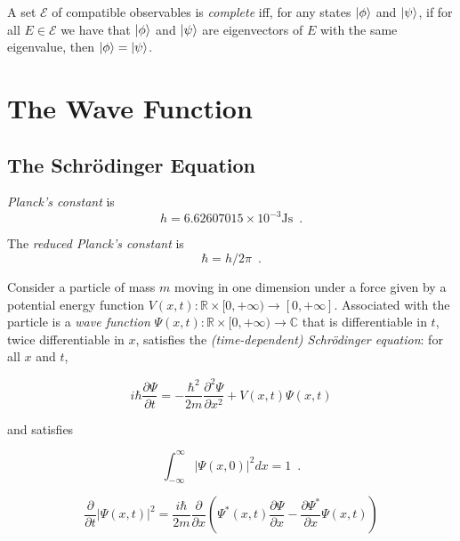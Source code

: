 \begin{df}[Complete]
A set $\mathcal{E}$ of compatible observables is \emph{complete} iff, for any states $\left| {\phi} \right\rangle$ and $\left| {\psi} \right\rangle$, if for all $E \in \mathcal{E}$ we have that $\left| {\phi} \right\rangle$ and $\left| {\psi} \right\rangle$ are eigenvectors of $E$ with the same eigenvalue, then $\left| {\phi} \right\rangle = \left| {\psi} \right\rangle$.
\end{df}

\chapter{The Wave Function}

\section{The Schr\"{o}dinger Equation}

\begin{df}
\emph{Planck's constant} is
\[ h = 6.62607015 \times 10^{-3} \mathrm{Js} \enspace . \]
\end{df}

\begin{df}
The \emph{reduced Planck's constant} is
\[ \hbar = h / 2 \pi \enspace . \]
\end{df}

Consider a particle of mass $m$ moving in one dimension under a force given by a potential energy function $V(x,t) : \mathbb{R} \times [0,+\infty) \rightarrow [0, + \infty]$. Associated with the particle is a \emph{wave function} $\Psi(x,t) : \mathbb{R} \times [0,+\infty) \rightarrow \mathbb{C}$ that is differentiable in $t$, twice differentiable in $x$, satisfies the \emph{(time-dependent) Schr\"{o}dinger equation}: for all $x$ and $t$,

\[ i \hbar \frac{\partial \Psi}{\partial t} = - \frac{\hbar^2}{2 m} \frac{\partial^2 \Psi}{\partial x^2} + V(x,t) \Psi(x,t) \]

and satisfies

\[ \int_{- \infty}^\infty |\Psi(x,0)|^2 dx = 1 \enspace . \]

\begin{prop}
\label{prop:differentiate_psi_squared}
\[ \frac{\partial}{\partial t} |\Psi(x,t)|^2 = \frac{i \hbar}{2m} \frac{\partial}{\partial x} \left(
\Psi^*(x,t) \frac{\partial \Psi}{\partial x} - \frac{\partial \Psi^*}{\partial x} \Psi(x,t) \right) \]
\end{prop}

